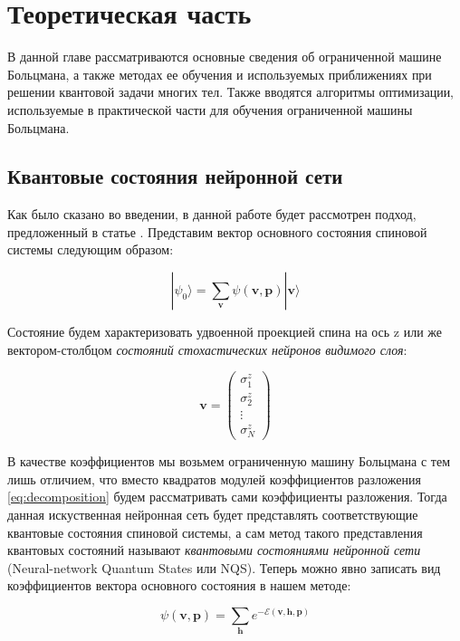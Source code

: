 \chapter{Теоретическая часть}

В данной главе рассматриваются основные сведения об ограниченной машине Больцмана, а также методах ее обучения и используемых приближениях при решении квантовой задачи многих тел.
Также вводятся алгоритмы оптимизации, используемые в практической части для обучения ограниченной машины Больцмана.

\section{Квантовые состояния нейронной сети}

Как было сказано во введении, в данной работе будет рассмотрен подход, предложенный в статье \cite{carleo2017solving}.
Представим вектор основного состояния спиновой системы следующим образом:

\begin{equation}\label{eq:decomposition}
|\psi_0 \rangle=\sum_{\mathbf{v}} \psi(\mathbf{v},\mathbf{p})|\mathbf{v} \rangle
\end{equation}

Состояние будем характеризовать удвоенной проекцией спина на ось z или же вектором-столбцом \textit{состояний стохастических нейронов видимого слоя}:

\[
\mathbf{v}=
\begin{pmatrix}
\sigma_1^z \\
\sigma_2^z \\
\vdots     \\
\sigma_N^z 
\end{pmatrix}
\]

В качестве коэффициентов мы возьмем ограниченную машину Больцмана с тем лишь отличием, что вместо квадратов модулей коэффициентов разложения \eqref{eq:decomposition} будем рассматривать сами коэффициенты разложения.
Тогда данная искуственная нейронная сеть будет представлять соответствующие квантовые состояния спиновой системы, а сам метод такого представления квантовых состояний называют \textit{квантовыми состояниями нейронной сети} (Neural-network Quantum States или NQS).
Теперь можно явно записать вид коэффициентов вектора основного состояния в нашем методе:

\begin{equation}
\psi(\mathbf{v},\mathbf{p})=\sum_{\mathbf{h}} e^{-\mathcal{E(\mathbf{v},\mathbf{h},\mathbf{p})}}
\end{equation}

